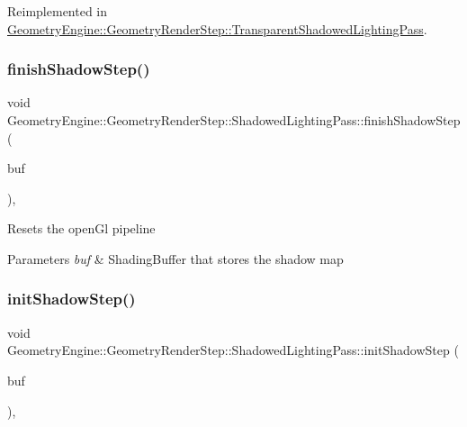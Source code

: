 Reimplemented in \mbox{\hyperlink{class_geometry_engine_1_1_geometry_render_step_1_1_transparent_shadowed_lighting_pass_ab88135daf4e0001a39ce4d9b4b7ff197}{Geometry\+Engine\+::\+Geometry\+Render\+Step\+::\+Transparent\+Shadowed\+Lighting\+Pass}}.

\mbox{\label{class_geometry_engine_1_1_geometry_render_step_1_1_shadowed_lighting_pass_aeedeb98164bebcb7c1cef69e529835e4}} 
\subsubsection{\texorpdfstring{finishShadowStep()}{finishShadowStep()}}
{\footnotesize\ttfamily void Geometry\+Engine\+::\+Geometry\+Render\+Step\+::\+Shadowed\+Lighting\+Pass\+::finish\+Shadow\+Step (\begin{DoxyParamCaption}\item[{\mbox{\hyperlink{class_geometry_engine_1_1_geometry_buffer_1_1_shading_buffer}{Geometry\+Buffer\+::\+Shading\+Buffer}} $\ast$}]{buf }\end{DoxyParamCaption})\hspace{0.3cm}{\ttfamily [protected]}, {\ttfamily [virtual]}}

Resets the open\+Gl pipeline 
\begin{DoxyParams}{Parameters}
{\em buf} & Shading\+Buffer that stores the shadow map \\
\hline
\end{DoxyParams}
\mbox{\label{class_geometry_engine_1_1_geometry_render_step_1_1_shadowed_lighting_pass_aa3e4ac77bbac23eedb2ae88d8ba1604f}} 
\subsubsection{\texorpdfstring{initShadowStep()}{initShadowStep()}}
{\footnotesize\ttfamily void Geometry\+Engine\+::\+Geometry\+Render\+Step\+::\+Shadowed\+Lighting\+Pass\+::init\+Shadow\+Step (\begin{DoxyParamCaption}\item[{\mbox{\hyperlink{class_geometry_engine_1_1_geometry_buffer_1_1_shading_buffer}{Geometry\+Buffer\+::\+Shading\+Buffer}} $\ast$}]{buf }\end{DoxyParamCaption})\hspace{0.3cm}{\ttfamily [protected]}, {\ttfamily [virtual]}}

